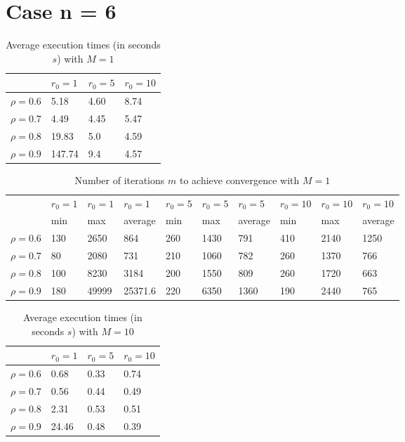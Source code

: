 \documentclass[a4paper,11pt,openright]{report}
\begin{document}
\section*{Case n = 6}  
\begin{table}[H]
\centering
\addtolength{\leftskip}{-1.5cm}
\addtolength{\rightskip}{-1.5cm}
\begin{tabular}{|c|lll|}
\hline
$ $ & $r_0 = 1$ & $r_0 = 5$ & $r_0 = 10$ \\
\hline
$\rho = 0.6$ & 5.18 & 4.60 & 8.74 \\

$\rho = 0.7$ & 4.49 & 4.45 & 5.47 \\

$\rho = 0.8$ & 19.83 & 5.0 & 4.59 \\

$\rho = 0.9$ & 147.74 & 9.4 & 4.57 \\
\hline
\end{tabular}
\caption{Average execution
 times (in seconds $s$) with $M = 1$}
\end{table}
\begin{table}[H]
\centering
\addtolength{\leftskip}{-1.5cm}
\addtolength{\rightskip}{-1.5cm}
\begin{tabular}{|c|lllllllll|}
\hline
$ $ & $r_0 = 1$ & $r_0 = 1$ & $r_0 = 1$ & $r_0 = 5$ & $r_0 = 5$ & $r_0 = 5$ & $r_0 = 10$ & $r_0 = 10$ & $r_0 = 10$  \\
$ $ & min & max & average & min & max & average & min & max & average \\ 
\hline
$\rho = 0.6$ & 130 & 2650 & 864 & 260 & 1430 & 791 & 410 &  2140 & 1250 \\

$\rho = 0.7$ & 80 & 2080 & 731 & 210 & 1060 & 782 & 260 & 1370 & 766\\

$\rho = 0.8$ & 100 & 8230 & 3184 & 200 & 1550 & 809 & 260 & 1720 & 663\\

$\rho = 0.9$ & 180 & 49999 & 25371.6 & 220 & 6350 & 1360 & 190 & 2440 & 765\\
\hline
\end{tabular}
\caption{Number of iterations $m$ to achieve convergence with $M = 1$}
\end{table}
\begin{table}[H]
\centering
\addtolength{\leftskip}{-1.5cm}
\addtolength{\rightskip}{-1.5cm}
\begin{tabular}{|c|lll|}
\hline
$ $ & $r_0 = 1$ & $r_0 = 5$ & $r_0 = 10$ \\
\hline
$\rho = 0.6$ & 0.68 & 0.33 & 0.74 \\

$\rho = 0.7$ & 0.56 & 0.44 & 0.49 \\

$\rho = 0.8$ & 2.31 & 0.53 & 0.51 \\

$\rho = 0.9$ & 24.46 & 0.48 & 0.39 \\
\hline
\end{tabular}
\caption{Average execution
 times (in seconds $s$) with $M = 10$}
\end{table}
\end{document}
